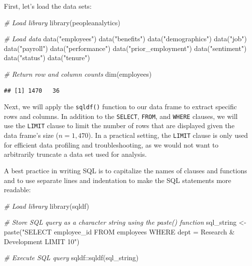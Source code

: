 \documentclass[
]{book}
\newenvironment{Shaded}{\begin{snugshade}}{\end{snugshade}}
\newcommand{\CommentTok}[1]{\textcolor[rgb]{0.56,0.35,0.01}{\textit{#1}}}
\newcommand{\FunctionTok}[1]{\textcolor[rgb]{0.00,0.00,0.00}{#1}}
\newcommand{\NormalTok}[1]{#1}
\newcommand{\OtherTok}[1]{\textcolor[rgb]{0.56,0.35,0.01}{#1}}
\newcommand{\SpecialCharTok}[1]{\textcolor[rgb]{0.00,0.00,0.00}{#1}}
\newcommand{\StringTok}[1]{\textcolor[rgb]{0.31,0.60,0.02}{#1}}
\begin{document}
First, let's load the data sets:

\begin{Shaded}
\begin{Highlighting}[]
\CommentTok{\# Load library}
\FunctionTok{library}\NormalTok{(peopleanalytics)}

\CommentTok{\# Load data}
\FunctionTok{data}\NormalTok{(}\StringTok{"employees"}\NormalTok{)}
\FunctionTok{data}\NormalTok{(}\StringTok{"benefits"}\NormalTok{)}
\FunctionTok{data}\NormalTok{(}\StringTok{"demographics"}\NormalTok{)}
\FunctionTok{data}\NormalTok{(}\StringTok{"job"}\NormalTok{)}
\FunctionTok{data}\NormalTok{(}\StringTok{"payroll"}\NormalTok{)}
\FunctionTok{data}\NormalTok{(}\StringTok{"performance"}\NormalTok{)}
\FunctionTok{data}\NormalTok{(}\StringTok{"prior\_employment"}\NormalTok{)}
\FunctionTok{data}\NormalTok{(}\StringTok{"sentiment"}\NormalTok{)}
\FunctionTok{data}\NormalTok{(}\StringTok{"status"}\NormalTok{)}
\FunctionTok{data}\NormalTok{(}\StringTok{"tenure"}\NormalTok{)}

\CommentTok{\# Return row and column counts}
\FunctionTok{dim}\NormalTok{(employees)}
\end{Highlighting}
\end{Shaded}

\begin{verbatim}
## [1] 1470   36
\end{verbatim}

Next, we will apply the \texttt{sqldf()} function to our data frame to extract specific rows and columns. In addition to the \texttt{SELECT}, \texttt{FROM}, and \texttt{WHERE} clauses, we will use the \texttt{LIMIT} clause to limit the number of rows that are displayed given the data frame's size (\(n = 1,470\)). In a practical setting, the \texttt{LIMIT} clause is only used for efficient data profiling and troubleshooting, as we would not want to arbitrarily truncate a data set used for analysis.

A best practice in writing SQL is to capitalize the names of clauses and functions and to use separate lines and indentation to make the SQL statements more readable:

\begin{Shaded}
\begin{Highlighting}[]
\CommentTok{\# Load library}
\FunctionTok{library}\NormalTok{(sqldf)}

\CommentTok{\# Store SQL query as a character string using the paste() function}
\NormalTok{sql\_string }\OtherTok{\textless{}{-}} \FunctionTok{paste}\NormalTok{(}\StringTok{"SELECT}
\StringTok{                      employee\_id}
\StringTok{                    FROM}
\StringTok{                      employees}
\StringTok{                    WHERE}
\StringTok{                      dept = \textquotesingle{}Research \& Development\textquotesingle{}}
\StringTok{                    LIMIT 10"}\NormalTok{)}

\CommentTok{\# Execute SQL query}
\NormalTok{sqldf}\SpecialCharTok{::}\FunctionTok{sqldf}\NormalTok{(sql\_string)}
\end{Highlighting}
\end{Shaded}
\end{document}
